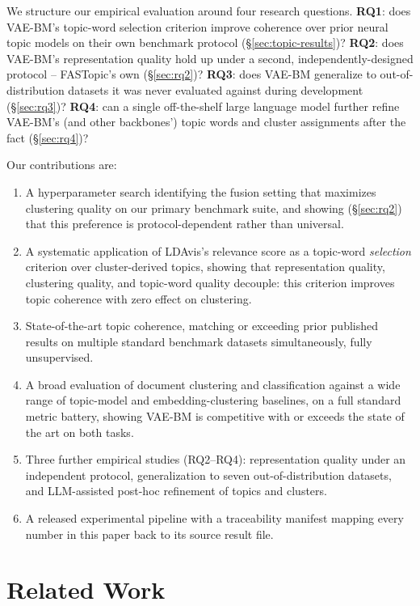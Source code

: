 \documentclass[11pt]{article}
\begin{document}
We structure our empirical evaluation around four research questions. \textbf{RQ1}: does VAE-BM's topic-word selection criterion improve coherence over prior neural topic models on their own benchmark protocol (\S\ref{sec:topic-results})? \textbf{RQ2}: does VAE-BM's representation quality hold up under a second, independently-designed protocol -- FASTopic's own (\S\ref{sec:rq2})? \textbf{RQ3}: does VAE-BM generalize to out-of-distribution datasets it was never evaluated against during development (\S\ref{sec:rq3})? \textbf{RQ4}: can a single off-the-shelf large language model further refine VAE-BM's (and other backbones') topic words and cluster assignments after the fact (\S\ref{sec:rq4})?

Our contributions are:
\begin{enumerate}
\item A hyperparameter search identifying the fusion setting that maximizes clustering quality on our primary benchmark suite, and showing (\S\ref{sec:rq2}) that this preference is protocol-dependent rather than universal.
\item A systematic application of LDAvis's relevance score as a topic-word \emph{selection} criterion over cluster-derived topics, showing that representation quality, clustering quality, and topic-word quality decouple: this criterion improves topic coherence with zero effect on clustering.
\item State-of-the-art topic coherence, matching or exceeding prior published results on multiple standard benchmark datasets simultaneously, fully unsupervised.
\item A broad evaluation of document clustering and classification against a wide range of topic-model and embedding-clustering baselines, on a full standard metric battery, showing VAE-BM is competitive with or exceeds the state of the art on both tasks.
\item Three further empirical studies (RQ2--RQ4): representation quality under an independent protocol, generalization to seven out-of-distribution datasets, and LLM-assisted post-hoc refinement of topics and clusters.
\item A released experimental pipeline with a traceability manifest mapping every number in this paper back to its source result file.
\end{enumerate}

\section{Related Work}
\label{sec:related-work}
\end{document}

